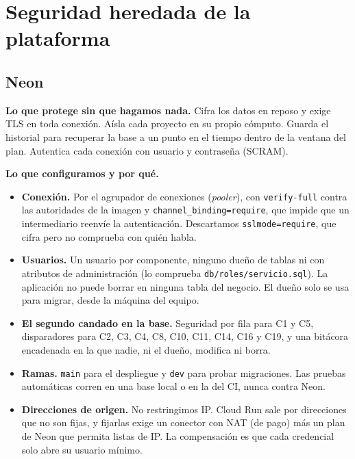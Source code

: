 \documentclass[11pt,letterpaper]{article}
\newcommand{\cod}[1]{\texttt{\small #1}}
\newcommand{\arch}[1]{\texttt{\small #1}}
\begin{document}
\section{Seguridad heredada de la plataforma}

\subsection{Neon}

\textbf{Lo que protege sin que hagamos nada.} Cifra los datos en reposo y exige TLS en toda conexión.
Aísla cada proyecto en su propio cómputo. Guarda el historial para recuperar la base a un punto en
el tiempo dentro de la ventana del plan. Autentica cada conexión con usuario y contraseña (SCRAM).

\textbf{Lo que configuramos y por qué.}
\begin{itemize}
  \item \textbf{Conexión.} Por el agrupador de conexiones (\emph{pooler}), con \cod{verify-full}
    contra las autoridades de la imagen y \cod{channel\_binding=require}, que impide que un
    intermediario reenvíe la autenticación. Descartamos \cod{sslmode=require}, que cifra pero no
    comprueba con quién habla.
  \item \textbf{Usuarios.} Un usuario por componente, ninguno dueño de tablas ni con atributos de
    administración (lo comprueba \arch{db/roles/servicio.sql}). La aplicación no puede borrar en
    ninguna tabla del negocio. El dueño solo se usa para migrar, desde la máquina del equipo.
  \item \textbf{El segundo candado en la base.} Seguridad por fila para C1 y C5, disparadores para
    C2, C3, C4, C8, C10, C11, C14, C16 y C19, y una bitácora encadenada en la que nadie, ni el dueño,
    modifica ni borra.
  \item \textbf{Ramas.} \cod{main} para el despliegue y \cod{dev} para probar migraciones. Las pruebas
    automáticas corren en una base local o en la del CI, nunca contra Neon.
  \item \textbf{Direcciones de origen.} No restringimos IP. Cloud Run sale por direcciones que no
    son fijas, y fijarlas exige un conector con NAT (de pago) más un plan de Neon que permita listas
    de IP. La compensación es que cada credencial solo abre su usuario mínimo.
\end{itemize}
\end{document}
